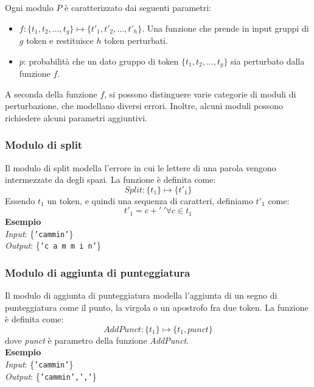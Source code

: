 \documentclass[12pt]{article}
\begin{document}
Ogni modulo $P$ è caratterizzato dai seguenti parametri:
\begin{itemize}
\item $f: \{ t_1,t_2,..., t_g  \} \mapsto \{ t'_1,t'_2,..., t'_h  \} $. Una funzione che prende in input gruppi di $g$ token e restituisce $h$ token perturbati.
\item $p$: probabilità che un dato gruppo di token $\{ t_1,t_2,..., t_g  \}$ sia perturbato dalla funzione $f$.
\end{itemize}

A seconda della funzione $f$, si possono distinguere varie categorie di moduli di perturbazione, che modellano diversi errori. Inoltre, alcuni moduli possono richiedere alcuni parametri aggiuntivi.

\subsubsection{Modulo di split}
Il modulo di split modella l'errore in cui le lettere di una parola vengono intermezzate da degli spazi. La funzione è definita come:
\begin{equation}
\textit{Split}: \{ t_1 \} \mapsto \{ t'_1 \}
\end{equation}
Essendo $t_1$ un token, e quindi una sequenza di caratteri, definiamo $t'_1$ come:
\begin{equation}
t'_1 = c + '\ ' \forall c \in t_1
\end{equation}
\textbf{Esempio}\\
\textit{Input}: \{\texttt{'cammin'}\}\\
\textit{Output}: \{\texttt{'c a m m i n'}\}

\subsubsection{Modulo di aggiunta di punteggiatura}
Il modulo di aggiunta di punteggiatura modella l'aggiunta di un segno di punteggiatura come il punto, la virgola o un apostrofo fra due token. La funzione è definita come:
\begin{equation}
\textit{AddPunct}: \{ t_1 \} \mapsto \{ t_1, \textit{punct} \}
\end{equation}
dove \textit{punct} è parametro della funzione \textit{AddPunct}.\\
\textbf{Esempio}\\
\textit{Input}: \{\texttt{'cammin'}\}\\
\textit{Output}: \{\texttt{'cammin',','}\}
\end{document}
